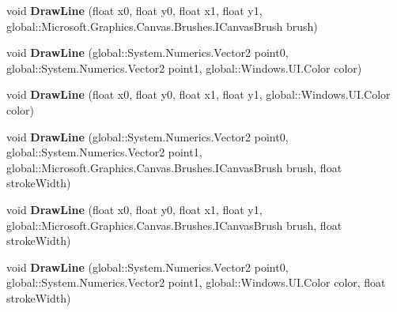 \begin{DoxyCompactItemize}
\item 
\mbox{\label{class_microsoft_1_1_graphics_1_1_canvas_1_1_canvas_drawing_session_a7dd9cbef51eb671c3cb8ccd51282c333}} 
void {\bfseries Draw\+Line} (float x0, float y0, float x1, float y1, global\+::\+Microsoft.\+Graphics.\+Canvas.\+Brushes.\+I\+Canvas\+Brush brush)
\item 
\mbox{\label{class_microsoft_1_1_graphics_1_1_canvas_1_1_canvas_drawing_session_aadc6010b8c40aa683e392af2302acbd6}} 
void {\bfseries Draw\+Line} (global\+::\+System.\+Numerics.\+Vector2 point0, global\+::\+System.\+Numerics.\+Vector2 point1, global\+::\+Windows.\+U\+I.\+Color color)
\item 
\mbox{\label{class_microsoft_1_1_graphics_1_1_canvas_1_1_canvas_drawing_session_a572c7f875ce2e34539e4f62a1ae5b468}} 
void {\bfseries Draw\+Line} (float x0, float y0, float x1, float y1, global\+::\+Windows.\+U\+I.\+Color color)
\item 
\mbox{\label{class_microsoft_1_1_graphics_1_1_canvas_1_1_canvas_drawing_session_a778adc9552661fbfd8dee99425bd68a6}} 
void {\bfseries Draw\+Line} (global\+::\+System.\+Numerics.\+Vector2 point0, global\+::\+System.\+Numerics.\+Vector2 point1, global\+::\+Microsoft.\+Graphics.\+Canvas.\+Brushes.\+I\+Canvas\+Brush brush, float stroke\+Width)
\item 
\mbox{\label{class_microsoft_1_1_graphics_1_1_canvas_1_1_canvas_drawing_session_ac7ce6ddec12a24029cf030938e2a90f6}} 
void {\bfseries Draw\+Line} (float x0, float y0, float x1, float y1, global\+::\+Microsoft.\+Graphics.\+Canvas.\+Brushes.\+I\+Canvas\+Brush brush, float stroke\+Width)
\item 
\mbox{\label{class_microsoft_1_1_graphics_1_1_canvas_1_1_canvas_drawing_session_a54c5159a162bb81d7a2a3cff40c92e8d}} 
void {\bfseries Draw\+Line} (global\+::\+System.\+Numerics.\+Vector2 point0, global\+::\+System.\+Numerics.\+Vector2 point1, global\+::\+Windows.\+U\+I.\+Color color, float stroke\+Width)

\end{DoxyCompactItemize}
